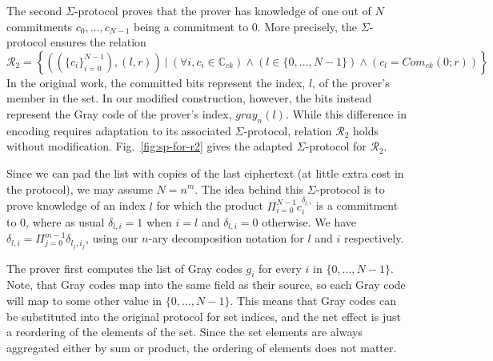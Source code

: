 \documentclass{article}
\begin{document}
The second $\Sigma$-protocol proves that the prover has knowledge of one out of $N$ commitments $c_0,...,c_{N-1}$ being a commitment to 0. More precisely, the $\Sigma$-protocol ensures the relation
$$\mathcal{R}_2 = \left\{((\{c_i\}_{i=0}^{N-1}),(l,r))\ |\ (\forall{i,c_i} \in \mathbb{C}_{ck}) \land (l \in \{0,...,N-1\}) \land (c_l = Com_{ck}(0;r)) \right\}$$
In the original work, the committed bits represent the index, $l$, of the prover's member in the set. In our modified construction, however, the bits instead represent the Gray code of the prover's index, $gray_n(l)$. While this difference in encoding requires adaptation to its associated $\Sigma$-protocol, relation $\mathcal{R}_2$ holds without modification. Fig.~\ref{fig:sp-for-r2} gives the adapted $\Sigma$-protocol for $\mathcal{R}_2$.

Since we can pad the list with copies of the last ciphertext (at little extra cost in the protocol), we may assume $N=n^m$. The idea behind this $\Sigma$-protocol is to prove knowledge of an index $l$ for which the product $\Pi_{i=0}^{N-1}c_i^{\delta_{l,i}}$ is a commitment to 0, where as usual $\delta_{l,i}=1$ when $i=l$ and $\delta_{l,i} = 0$ otherwise. We have $\delta_{l,i} = \Pi_{j=0}^{m-1} \delta_{l_j,i_j}$, using our $n$-ary decomposition notation for $l$ and $i$ respectively.

The prover first computes the list of Gray codes $g_i$ for every $i$ in $\{0,...,N-1\}$. Note, that Gray codes map into the same field as their source, so each Gray code will map to some other value in $\{0,...,N-1\}$. This means that Gray codes can be substituted into the original protocol for set indices, and the net effect is just a reordering of the elements of the set. Since the set elements are always aggregated either by sum or product, the ordering of elements does not matter.
\end{document}
